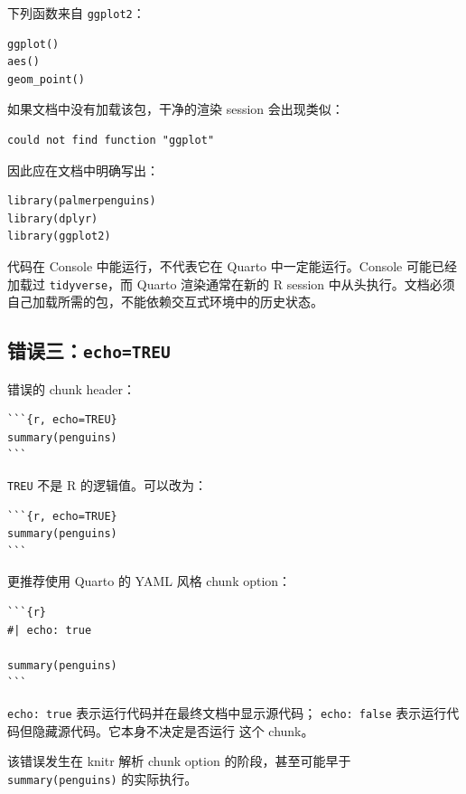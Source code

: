 \documentclass[11pt,a4paper]{ctexart}
\begin{document}
下列函数来自 \texttt{ggplot2}：

\begin{lstlisting}[style=rcode]
ggplot()
aes()
geom_point()
\end{lstlisting}

如果文档中没有加载该包，干净的渲染 session 会出现类似：

\begin{lstlisting}[style=textcode]
could not find function "ggplot"
\end{lstlisting}

因此应在文档中明确写出：

\begin{lstlisting}[style=rcode]
library(palmerpenguins)
library(dplyr)
library(ggplot2)
\end{lstlisting}

代码在 Console 中能运行，不代表它在 Quarto 中一定能运行。Console
可能已经加载过 \texttt{tidyverse}，而 Quarto 渲染通常在新的 R session
中从头执行。文档必须自己加载所需的包，不能依赖交互式环境中的历史状态。

\subsection{错误三：\texttt{echo=TREU}}

错误的 chunk header：

\begin{lstlisting}[style=textcode]
```{r, echo=TREU}
summary(penguins)
```
\end{lstlisting}

\lstinline|TREU| 不是 R 的逻辑值。可以改为：

\begin{lstlisting}[style=textcode]
```{r, echo=TRUE}
summary(penguins)
```
\end{lstlisting}

更推荐使用 Quarto 的 YAML 风格 chunk option：

\begin{lstlisting}[style=textcode]
```{r}
#| echo: true

summary(penguins)
```
\end{lstlisting}

\lstinline|echo: true| 表示运行代码并在最终文档中显示源代码；
\lstinline|echo: false| 表示运行代码但隐藏源代码。它本身不决定是否运行
这个 chunk。

该错误发生在 knitr 解析 chunk option 的阶段，甚至可能早于
\lstinline|summary(penguins)| 的实际执行。
\end{document}
